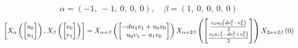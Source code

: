 \documentclass[11pt]{article}
\theoremstyle{definition}
\begin{document}
\[
\alpha = \left( -1, \  -1, \  0, \  0, \  0\right), \quad \beta = \left( 1, \  0, \  0, \  0, \  0\right)
\]
\[
\scaletoalign{\textwidth}{\left[ X_{\alpha}\left(\left[\begin{matrix}u_{0}\\u_{1}\end{matrix}\right]\right), X_{\beta}\left(\left[\begin{matrix}v_{0}\\v_{1}\end{matrix}\right]\right) \right] = X_{\alpha + \beta}\left(\left[\begin{matrix}- d u_{1} v_{1} + u_{0} v_{0}\\u_{0} v_{1} - u_{1} v_{0}\end{matrix}\right]\right) X_{\alpha + 2\beta}\left(\left[\begin{matrix}\frac{c_{0} u_{0} \left(d v_{1}^{2} - v_{0}^{2}\right)}{2}\\\frac{c_{0} u_{1} \left(- d v_{1}^{2} + v_{0}^{2}\right)}{2}\end{matrix}\right]\right) X_{2\alpha + 2\beta}\left(0\right)}
\]
\end{document}
